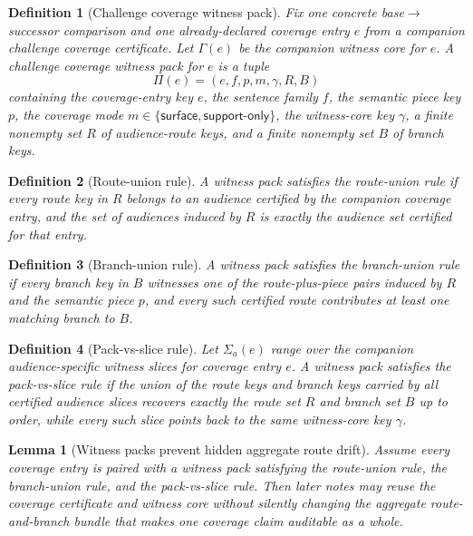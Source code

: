 \documentclass[11pt]{article}
\newtheorem{definition}{Definition}
\newtheorem{lemma}{Lemma}
\begin{document}
\begin{definition}[Challenge coverage witness pack]
Fix one concrete base$\to$successor comparison and one already-declared coverage entry $e$ from a companion challenge coverage certificate.
Let $\Gamma(e)$ be the companion witness core for $e$.
A \emph{challenge coverage witness pack} for $e$ is a tuple
\[
\Pi(e)=(e,f,p,m,\gamma,R,B)
\]
containing the coverage-entry key $e$, the sentence family $f$, the semantic piece key $p$, the coverage mode $m\in\{\textsf{surface},\textsf{support-only}\}$, the witness-core key $\gamma$, a finite nonempty set $R$ of audience-route keys, and a finite nonempty set $B$ of branch keys.
\end{definition}

\begin{definition}[Route-union rule]
A witness pack satisfies the \emph{route-union rule} if every route key in $R$ belongs to an audience certified by the companion coverage entry, and the set of audiences induced by $R$ is exactly the audience set certified for that entry.
\end{definition}

\begin{definition}[Branch-union rule]
A witness pack satisfies the \emph{branch-union rule} if every branch key in $B$ witnesses one of the route-plus-piece pairs induced by $R$ and the semantic piece $p$, and every such certified route contributes at least one matching branch to $B$.
\end{definition}

\begin{definition}[Pack-vs-slice rule]
Let $\Sigma_a(e)$ range over the companion audience-specific witness slices for coverage entry $e$.
A witness pack satisfies the \emph{pack-vs-slice rule} if the union of the route keys and branch keys carried by all certified audience slices recovers exactly the route set $R$ and branch set $B$ up to order, while every such slice points back to the same witness-core key $\gamma$.
\end{definition}

\begin{lemma}[Witness packs prevent hidden aggregate route drift]
Assume every coverage entry is paired with a witness pack satisfying the route-union rule, the branch-union rule, and the pack-vs-slice rule.
Then later notes may reuse the coverage certificate and witness core without silently changing the aggregate route-and-branch bundle that makes one coverage claim auditable as a whole.
\end{lemma}
\end{document}
